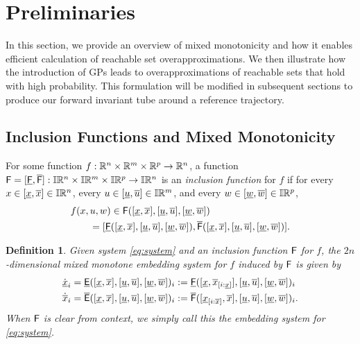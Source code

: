 \documentclass{IEEEojcsys}
\newcommand{\ul}{\underline}
\newtheorem{definition}{Definition}
\newcommand{\ol}{\overline}
\begin{document}
\section{Preliminaries}
\label{section:prelim}
In this section, we provide an overview of mixed monotonicity and how it enables efficient calculation of reachable set overapproximations. We then illustrate how the introduction of \acp{GP} leads to overapproximations of reachable sets that hold with high probability. This formulation will be modified in subsequent sections to produce our forward invariant tube around a reference trajectory.

\subsection{Inclusion Functions and Mixed Monotonicity}
For some function $f: \mathbb{R}^n \times \mathbb{R}^m \times \mathbb{R}^p\rightarrow\mathbb{R}^n$, a function $\sfF = [\ul{\sfF}, \ol{\sfF}]:\bbI\bbR^n\times\bbI\bbR^m\times\bbI\bbR^p\rightarrow\bbI\bbR^n$ is an \emph{inclusion function} for $f$ if for every $x\in[\ul{x}, \ol{x}]\in\bbI\bbR^n$, every $u\in[\ul{u}, \ol{u}]\in\bbI\bbR^m$, and every $w\in[\ul{w}, \ol{w}]\in\bbI\bbR^p$,
\begin{align}
    f(x, u, w) &\in \sfF([\ul{x}, \ol{x}], [\ul{u}, \ol{u}], [\ul{w}, \ol{w}])  \label{eq:inclusion_def}\\
    = [\ul{\sfF}&([\ul{x}, \ol{x}], [\ul{u}, \ol{u}], [\ul{w}, \ol{w}]), \ol{\sfF}([\ul{x}, \ol{x}], [\ul{u}, \ol{u}], [\ul{w}, \ol{w}])].\nonumber
\end{align}
\begin{definition}
Given system \eqref{eq:system} and an inclusion function $\mathsf{F}$ for $f$, the \emph{$2n$-dimensional mixed monotone embedding system for $f$ induced by $\mathsf{F}$} is given by %
\begin{align}
    \dot{\ul{x}}_i&= \ul{\sfE}([\ul{x}, \ol{x}], [\ul{u}, \ol{u}], [\ul{w}, \ol{w}])_i := \ul{\sfF}([\ul{x}, \ol{x}_{[i:\ul{x}]}], [\ul{u}, \ol{u}], [\ul{w}, \ol{w}])_i\label{eq:ulx_dot}\\
    \dot{\ol{x}}_i&= \ol{\sfE}([\ul{x}, \ol{x}], [\ul{u}, \ol{u}], [\ul{w}, \ol{w}])_i := \ol{\sfF}([\ul{x}_{[i:\ol{x}]}, \ol{x}], [\ul{u}, \ol{u}], [\ul{w}, \ol{w}])_i\label{eq:olx_dot}.
\end{align}
When $\mathsf{F}$ is clear from context, we simply call this the \emph{embedding system} for \eqref{eq:system}. 
\end{definition}
\end{document}

